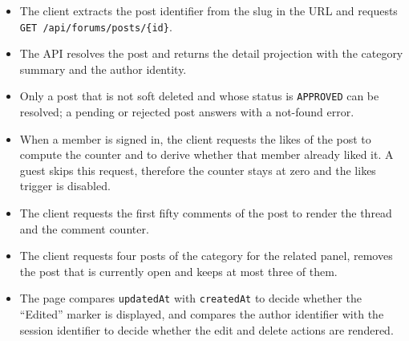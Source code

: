 \begin{itemize}[leftmargin=1.6em,topsep=3pt,itemsep=2pt,parsep=0pt,label=$\bullet$]
      \item The client extracts the post identifier from the slug in the URL and requests
            \texttt{GET /api/forums/posts/\{id\}}.
      \item The API resolves the post and returns the detail projection with the category
            summary and the author identity.
      \item Only a post that is not soft deleted and whose status is \texttt{APPROVED} can
            be resolved; a pending or rejected post answers with a not-found error.
      \item When a member is signed in, the client requests the likes of the post to
            compute the counter and to derive whether that member already liked it. A guest
            skips this request, therefore the counter stays at zero and the likes trigger
            is disabled.
      \item The client requests the first fifty comments of the post to render the thread
            and the comment counter.
      \item The client requests four posts of the category for the related panel, removes
            the post that is currently open and keeps at most three of them.
      \item The page compares \texttt{updatedAt} with \texttt{createdAt} to decide whether
            the ``Edited'' marker is displayed, and compares the author identifier with the
            session identifier to decide whether the edit and delete actions are rendered.
\end{itemize}

